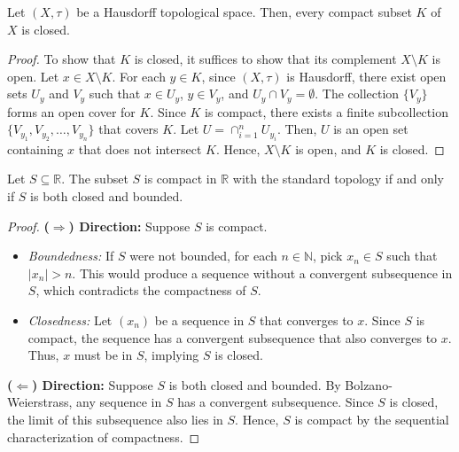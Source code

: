 \begin{theorem}
    Let \( (X, \tau) \) be a Hausdorff topological space. Then, every compact subset \( K \) of \( X \) is closed.
\end{theorem}
  \begin{proof}
        To show that \( K \) is closed, it suffices to show that its complement \( X \setminus K \) is open. Let \( x \in X \setminus K \). For each \( y \in K \), since \( (X, \tau) \) is Hausdorff, there exist open sets \( U_y \) and \( V_y \) such that \( x \in U_y \), \( y \in V_y \), and \( U_y \cap V_y = \emptyset \). The collection \( \{ V_y \} \) forms an open cover for \( K \). Since \( K \) is compact, there exists a finite subcollection \( \{ V_{y_1}, V_{y_2}, \ldots, V_{y_n} \} \) that covers \( K \). Let \( U = \cap_{i=1}^{n} U_{y_i} \). Then, \( U \) is an open set containing \( x \) that does not intersect \( K \). Hence, \( X \setminus K \) is open, and \( K \) is closed.
    \end{proof}
\begin{theorem}
    Let \( S \subseteq \mathbb{R} \). The subset \( S \) is compact in \( \mathbb{R} \) with the standard topology if and only if \( S \) is both closed and bounded.
\end{theorem}
\begin{proof}
        \textbf{($\Rightarrow$) Direction:} Suppose \( S \) is compact. 
        \begin{itemize}
            \item \textit{Boundedness:} If \( S \) were not bounded, for each \( n \in \mathbb{N} \), pick \( x_n \in S \) such that \( |x_n| > n \). This would produce a sequence without a convergent subsequence in \( S \), which contradicts the compactness of \( S \).
            \item \textit{Closedness:} Let \( (x_n) \) be a sequence in \( S \) that converges to \( x \). Since \( S \) is compact, the sequence has a convergent subsequence that also converges to \( x \). Thus, \( x \) must be in \( S \), implying \( S \) is closed.
        \end{itemize}

        \textbf{($\Leftarrow$) Direction:} Suppose \( S \) is both closed and bounded. By Bolzano-Weierstrass, any sequence in \( S \) has a convergent subsequence. Since \( S \) is closed, the limit of this subsequence also lies in \( S \). Hence, \( S \) is compact by the sequential characterization of compactness.
    \end{proof}



